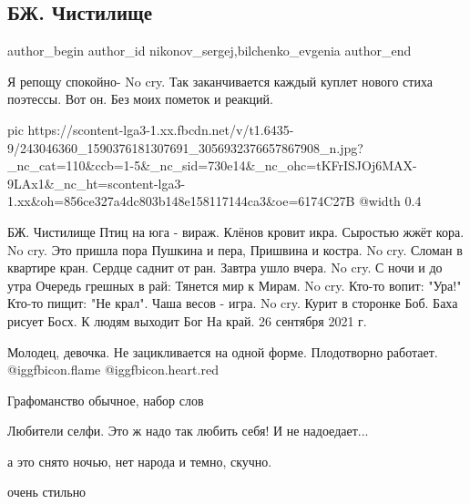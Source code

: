  
 
 
 
 
 
\subsection{БЖ. Чистилище}
\label{sec:26_09_2021.fb.nikonov_sergej.1.bilchenko_chistilische}
 
\ifcmt
 author_begin
   author_id nikonov_sergej,bilchenko_evgenia
 author_end
\fi

Я репощу спокойно- No cry. Так заканчивается каждый куплет нового стиха
поэтессы. Вот он. Без моих пометок и реакций.

\ifcmt
  pic https://scontent-lga3-1.xx.fbcdn.net/v/t1.6435-9/243046360_1590376181307691_3056932376657867908_n.jpg?_nc_cat=110&ccb=1-5&_nc_sid=730e14&_nc_ohc=tKFrISJOj6MAX-9LAx1&_nc_ht=scontent-lga3-1.xx&oh=856ce327a4dc803b148e158117144ca3&oe=6174C27B
  @width 0.4
\fi

БЖ. Чистилище
Птиц на юга - вираж.
Клёнов кровит икра.
Сыростью жжёт кора.
No cry.
Это пришла пора
Пушкина и пера,
Пришвина и костра.
No cry.
Сломан в квартире кран.
Сердце саднит от ран.
Завтра ушло вчера.
No cry.
С ночи и до утра
Очередь грешных в рай:
Тянется мир к Мирам.
No cry.
Кто-то вопит: "Ура!"
Кто-то пищит: "Не крал".
Чаша весов - игра.
No cry.
Курит в сторонке Боб.
Баха рисует Босх.
К людям выходит Бог
На край.
26 сентября 2021 г.

\begin{itemize} %
Молодец, девочка. Не зацикливается на одной форме. Плодотворно работает.  @igg{fbicon.flame} @igg{fbicon.heart.red}

Графоманство обычное, набор слов

Любители селфи. Это ж надо так любить себя! И не надоедает...

а это снято ночью, нет народа и темно, скучно.

очень стильно
\end{itemize} %
